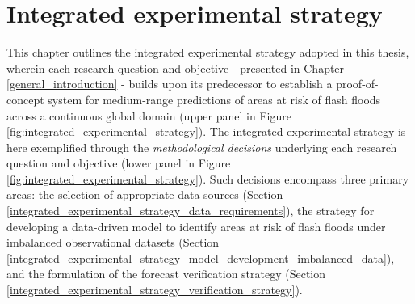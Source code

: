 \chapter{Integrated experimental strategy}
\label{integrated_experimental_strategy}
\graphicspath{{chapter_03/figures}{chapter_03/tables}}


This chapter outlines the integrated experimental strategy adopted in this thesis, wherein each research question and objective - presented in Chapter \ref{general_introduction} - builds upon its predecessor to establish a proof-of-concept system for medium-range predictions of areas at risk of flash floods across a continuous global domain (upper panel in Figure \ref{fig:integrated_experimental_strategy}). The integrated experimental strategy is here exemplified through the \textit{methodological decisions} underlying each research question and objective (lower panel in Figure \ref{fig:integrated_experimental_strategy}). Such decisions encompass three primary areas: the selection of appropriate data sources (Section \ref{integrated_experimental_strategy_data_requirements}), the strategy for developing a data-driven model to identify areas at risk of flash floods under imbalanced observational datasets (Section \ref{integrated_experimental_strategy_model_development_imbalanced_data}), and the formulation of the forecast verification strategy (Section \ref{integrated_experimental_strategy_verification_strategy}).

